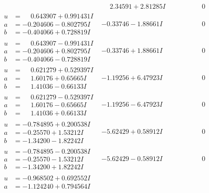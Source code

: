 \documentclass[1p]{elsarticle_modified}
\theoremstyle{definition}
\begin{document}
$$\begin{array}{c|c|c}
 & \phantom{-}2.34591 + 2.81285 I & \phantom{-0.000000 } 0 \\ \hline\begin{aligned}
u &= \phantom{-}0.643907 + 0.991431 I \\
a &= -0.204606 - 0.802795 I \\
b &= -0.404066 + 0.728819 I\end{aligned}
 & -0.33746 - 1.88661 I & \phantom{-0.000000 } 0 \\ \hline\begin{aligned}
u &= \phantom{-}0.643907 - 0.991431 I \\
a &= -0.204606 + 0.802795 I \\
b &= -0.404066 - 0.728819 I\end{aligned}
 & -0.33746 + 1.88661 I & \phantom{-0.000000 } 0 \\ \hline\begin{aligned}
u &= \phantom{-}0.621279 + 0.529397 I \\
a &= \phantom{-}1.60176 + 0.65665 I \\
b &= \phantom{-}1.41036 - 0.66133 I\end{aligned}
 & -1.19256 + 6.47923 I & \phantom{-0.000000 } 0 \\ \hline\begin{aligned}
u &= \phantom{-}0.621279 - 0.529397 I \\
a &= \phantom{-}1.60176 - 0.65665 I \\
b &= \phantom{-}1.41036 + 0.66133 I\end{aligned}
 & -1.19256 - 6.47923 I & \phantom{-0.000000 } 0 \\ \hline\begin{aligned}
u &= -0.784895 + 0.200538 I \\
a &= -0.25570 + 1.53212 I \\
b &= -1.34200 - 1.82242 I\end{aligned}
 & -5.62429 + 0.58912 I & \phantom{-0.000000 } 0 \\ \hline\begin{aligned}
u &= -0.784895 - 0.200538 I \\
a &= -0.25570 - 1.53212 I \\
b &= -1.34200 + 1.82242 I\end{aligned}
 & -5.62429 - 0.58912 I & \phantom{-0.000000 } 0 \\ \hline\begin{aligned}
u &= -0.968502 + 0.692552 I \\
a &= -1.124240 + 0.794564 I \\

\end{aligned}
\end{array}$$
\end{document}
